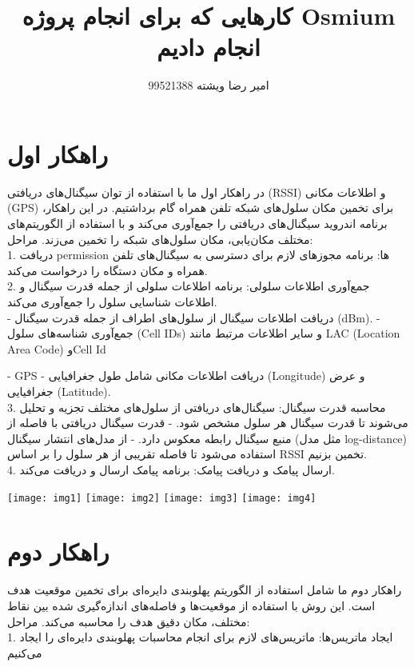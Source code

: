 \documentclass[]{report}
\author{امیر رضا ویشته 99521388}
\affil{محمدحسین رحیمی 99521298\\}
\title{کارهایی که برای انجام پروژه Osmium انجام دادیم}
\affil{درس شبکه های تلفن همراه}
\affil{دانشگاه علم و صنعت ایران}
\begin{document}
\maketitle
	\tableofcontents
	
\newpage

\section{راهکار اول}

در راهکار اول ما با استفاده از توان سیگنال‌های دریافتی (RSSI) و اطلاعات مکانی (GPS) برای تخمین مکان سلول‌های شبکه تلفن همراه گام برداشتیم. در این راهکار، برنامه اندروید سیگنال‌های دریافتی را جمع‌آوری می‌کند و با استفاده از الگوریتم‌های مختلف مکان‌یابی، مکان سلول‌های شبکه را تخمین می‌زند.
مراحل:\\
1.	دریافت permission ها: برنامه مجوزهای لازم برای دسترسی به سیگنال‌های تلفن همراه و مکان دستگاه را درخواست می‌کند.\\
2.	جمع‌آوری اطلاعات سلولی: برنامه اطلاعات سلولی از جمله قدرت سیگنال و اطلاعات شناسایی سلول را جمع‌آوری می‌کند.\\
- دریافت اطلاعات سیگنال از سلول‌های اطراف از جمله قدرت سیگنال (dBm).
- جمع‌آوری شناسه‌های سلول (Cell IDs) و سایر اطلاعات مرتبط مانند LAC (Location Area Code) وCell Id

- GPS
- دریافت اطلاعات مکانی شامل طول جغرافیایی (Longitude) و عرض جغرافیایی (Latitude).\\


3.	محاسبه قدرت سیگنال: سیگنال‌های دریافتی از سلول‌های مختلف تجزیه و تحلیل می‌شوند تا قدرت سیگنال هر سلول مشخص شود.
- قدرت سیگنال دریافتی با فاصله از منبع سیگنال رابطه معکوس دارد.
- از مدل‌های انتشار سیگنال (مثل مدل log-distance) استفاده می‌شود تا فاصله تقریبی از هر سلول را بر اساس RSSI تخمین بزنیم.\\
4.	ارسال پیامک و دریافت پیامک: برنامه پیامک ارسال و دریافت می‌کند.

\begin{center}
	\texttt{[image: img1]}
	\texttt{[image: img2]}
	\texttt{[image: img3]}
	\texttt{[image: img4]}
	
\end{center}

\section{راهکار دوم}
راهکار دوم ما شامل استفاده از الگوریتم پهلوبندی دایره‌ای  برای تخمین موقعیت هدف است. این روش با استفاده از موقعیت‌ها و فاصله‌های اندازه‌گیری شده بین نقاط مختلف، مکان دقیق هدف را محاسبه می‌کند.
مراحل:\\
1.	ایجاد ماتریس‌ها: ماتریس‌های لازم برای انجام محاسبات پهلوبندی دایره‌ای را ایجاد می‌کنیم\\
\end{document}
